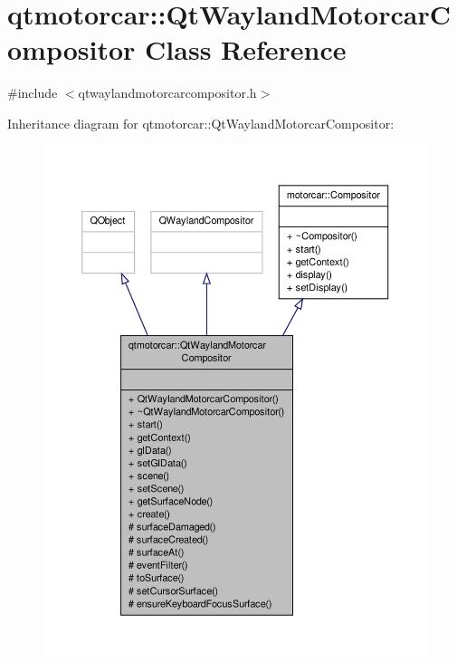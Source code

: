 \hypertarget{classqtmotorcar_1_1QtWaylandMotorcarCompositor}{\section{qtmotorcar\-:\-:Qt\-Wayland\-Motorcar\-Compositor Class Reference}
\label{classqtmotorcar_1_1QtWaylandMotorcarCompositor}
}


{\ttfamily \#include $<$qtwaylandmotorcarcompositor.\-h$>$}



Inheritance diagram for qtmotorcar\-:\-:Qt\-Wayland\-Motorcar\-Compositor\-:
\nopagebreak
\begin{figure}[H]
\begin{center}
\leavevmode
\includegraphics[width=350pt]{classqtmotorcar_1_1QtWaylandMotorcarCompositor__inherit__graph}
\end{center}
\end{figure}


